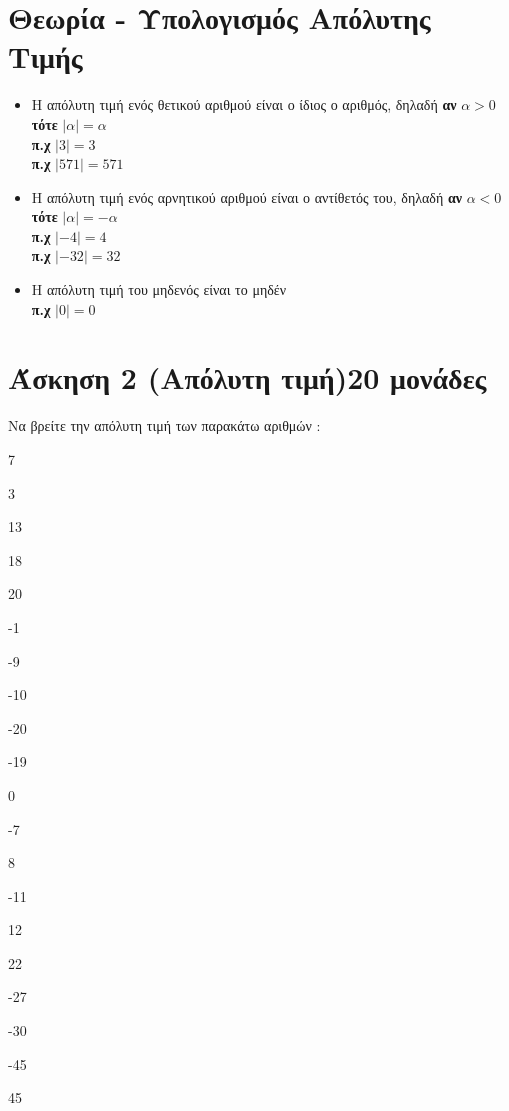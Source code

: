 \documentclass[a4paper,10pt]{report}
\begin{document}
\newpage
\section*{Θεωρία - Υπολογισμός Απόλυτης Τιμής\hfill \small{}}
\begin{itemize}
 \item  Η απόλυτη τιμή ενός θετικού αριθμού είναι ο ίδιος ο αριθμός, δηλαδή \textbf{αν} $α>0$ \textbf{τότε} $|α|=α$\\
         \textbf{π.χ} $|3|=3$\\
         \textbf{π.χ} $|571|=571$
 \item Η απόλυτη τιμή ενός αρνητικού αριθμού είναι ο αντίθετός του, δηλαδή \textbf{αν} $α<0$ \textbf{τότε} $|α|=-α$\\
         \textbf{π.χ} $|-4|=4$\\
         \textbf{π.χ} $|-32|=32$
 \item Η απόλυτη τιμή του μηδενός είναι το μηδέν\\
         \textbf{π.χ} $|0|=0$
\end{itemize}

\section*{Άσκηση 2  (Απόλυτη τιμή)\hfill \small{20 μονάδες}}
Να βρείτε την απόλυτη τιμή των παρακάτω αριθμών :
\begin{enumerate}[1)]
\begin{multicols}{4}
 \item 7
 \item 3
 \item 13
 \item 18
 \item 20
 \item -1
 \item -9
 \item -10
 \item -20
 \item -19
 \item 0
 \item -7
 \item 8
 \item -11
 \item 12
 \item 22
 \item -27
 \item -30
 \item -45
 \item 45
\end{multicols}
\end{enumerate}
\end{document}

